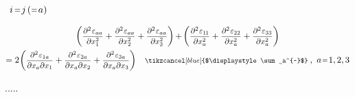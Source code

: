 \noindent
{}~${i \hspace{.1ex} \narroweq j \hspace{.33ex} ({} \hspace{-0.2ex} \narroweq a)}$

\nopagebreak\vspace{-0.2em}
\begin{multline*}
\biggl(
\scalebox{.9}{$ \displaystyle \frac{\partial^2 \infinitesimaldeformationcomponents{aa}}{\partial x_1^2} $}
+ \scalebox{.9}{$ \displaystyle \frac{\partial^2 \infinitesimaldeformationcomponents{aa}}{\partial x_2^2} $}
+ \scalebox{.9}{$ \displaystyle \frac{\partial^2 \infinitesimaldeformationcomponents{aa}}{\partial x_3^2} $}
\biggr)
\hspace{-0.2ex} + \hspace{-0.2ex}
\biggl(
\scalebox{.9}{$ \displaystyle \frac{\partial^2 \infinitesimaldeformationcomponents{1\hspace{-0.1ex}1}}{\partial x_{a}^2} $}
+ \scalebox{.9}{$ \displaystyle \frac{\partial^2 \infinitesimaldeformationcomponents{22}}{\partial x_{a}^2} $}
+ \scalebox{.9}{$ \displaystyle \frac{\partial^2 \infinitesimaldeformationcomponents{33}}{\partial x_{a}^2} $}
\biggr)
\\
%
= 2 \hspace{.1ex}
\biggl(
\scalebox{.9}{$ \displaystyle \frac{\partial^2 \infinitesimaldeformationcomponents{1 a}}{\partial x_{a} \partial x_{1}} $}
+ \scalebox{.9}{$ \displaystyle \frac{\partial^2 \infinitesimaldeformationcomponents{2 a}}{\partial x_{a} \partial x_{2}} $}
+ \scalebox{.9}{$ \displaystyle \frac{\partial^2 \infinitesimaldeformationcomponents{3 a}}{\partial x_{a} \partial x_{3}} $}
\biggr)
\hspace{1em}
\scalebox{.8}{$\tikzcancel[blue]{$\displaystyle\sum_a^{~}$}$}\:, \hspace{.33em} a \narroweq 1,2,3
\end{multline*}

.....

